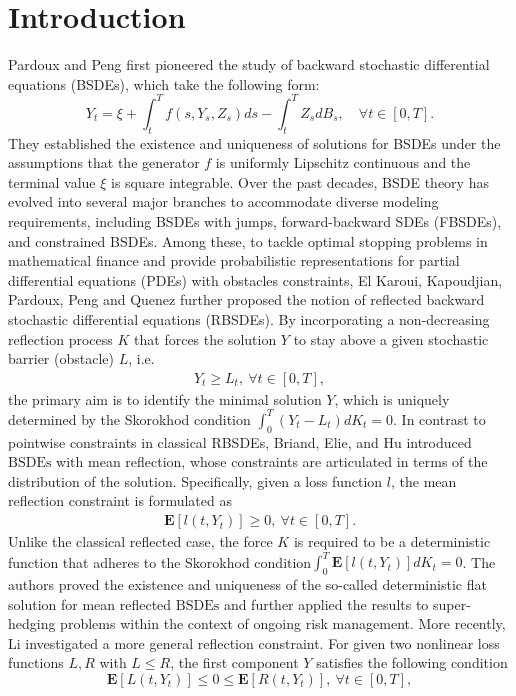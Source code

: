 \documentclass[10pt]{article}%
\numberwithin{equation}{section}
\begin{document}
\section{Introduction}
Pardoux and Peng \cite{PP} first pioneered the study of backward stochastic differential equations (BSDEs), which take the following form:
\begin{equation}
 Y_t=\xi+\int_t^T f(s,Y_s,Z_s)ds-\int_t^T Z_s dB_s,\quad \forall t\in[0,T].   
\end{equation}
They established the existence and uniqueness of solutions for BSDEs under the assumptions that the generator $f$ is uniformly Lipschitz continuous and the terminal value $\xi$ is square integrable.  Over the past decades, BSDE theory has evolved into several major branches to accommodate diverse modeling requirements, including BSDEs with jumps, forward-backward SDEs (FBSDEs), and constrained BSDEs. Among these, to tackle optimal stopping problems in mathematical finance and provide probabilistic representations for partial differential equations (PDEs) with obstacles constraints,  El Karoui, Kapoudjian, Pardoux, Peng and Quenez \cite{EKPPQ} further proposed the notion of reflected backward stochastic differential equations (RBSDEs). %
 By incorporating a non-decreasing reflection process $K$ that forces the solution $Y$ to stay above a given stochastic barrier (obstacle) $L$, i.e. %
 \begin{align}\label{constraint pointwise}
   Y_t\geq L_t, \ \forall t\in[0,T],  
 \end{align}
 the primary aim is to identify the minimal solution $Y$, which is uniquely determined by the Skorokhod condition $\int_{0}^{T} (Y_t-L_t) dK_t=0$. In contrast to pointwise constraints in classical RBSDEs, Briand, Elie, and Hu  \cite{BEH} introduced $\text{BSDEs}$ with mean reflection, whose constraints are articulated in terms of the distribution of the solution. Specifically, given a loss function $l$, the mean reflection constraint is formulated as 
 \begin{align}\label{constraint expectation}
 \mathbf{E}[l(t,Y_t)]\geq 0, \ \forall t\in[0,T].
 \end{align}
 Unlike the classical reflected case, the force $K$ is required to be a deterministic function that adheres to the Skorokhod condition$\int_{0}^{T}\mathbf{E}[l(t,Y_t)]dK_t=0$. The authors proved the existence and uniqueness of the so-called deterministic flat solution for mean reflected $\text{BSDEs}$ and further applied the results to  super-hedging problems within the context of ongoing risk management. More recently, Li \cite{L} investigated a more general reflection constraint. For given two nonlinear loss functions $L,R$  with $L\leq R$, the first component $Y$  satisfies the following condition $$\mathbf{E}[L(t,Y_t)]\leq 0\leq \mathbf{E}[R(t,Y_t)], \ \forall t\in[0,T],$$ 
\end{document}
